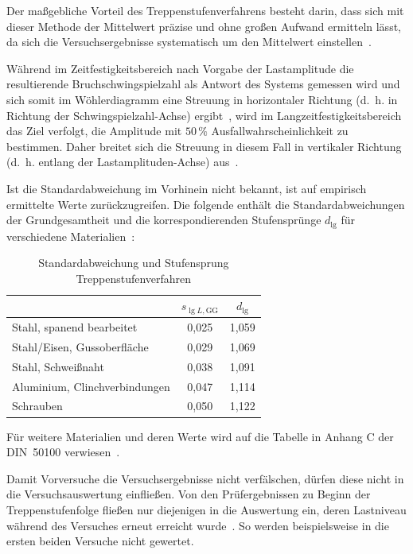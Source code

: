 Der maßgebliche Vorteil des Treppenstufenverfahrens besteht darin, dass sich mit dieser Methode der Mittelwert präzise und ohne großen Aufwand ermitteln lässt, da sich die Versuchsergebnisse systematisch um den Mittelwert einstellen~\cite[Seite~47]{DIN50100}. 

Während im Zeitfestigkeitsbereich nach Vorgabe der Lastamplitude die resultierende Bruchschwingspielzahl als Antwort des Systems gemessen wird und sich somit im Wöhlerdiagramm eine Streuung in horizontaler Richtung (d.~h. in Richtung der Schwingspielzahl-Achse) ergibt~\cite[Seite~54]{DIN50100}, wird im Langzeitfestigkeitsbereich das Ziel verfolgt, die Amplitude mit $50\,\%$ Ausfallwahrscheinlichkeit zu bestimmen. Daher breitet sich die Streuung in diesem Fall in vertikaler Richtung (d.~h. entlang der Lastamplituden-Achse) aus~\cite[Seite~44]{DIN50100}.

Ist die Standardabweichung im Vorhinein nicht bekannt, ist auf empirisch ermittelte Werte zurückzugreifen. Die folgende  enthält die Standardabweichungen der Grundgesamtheit und die korrespondierenden Stufensprünge $d_{\lg}$ für verschiedene Materialien~\cite[Seite~48]{DIN50100}:

\begin{table}[H]
\centering
\renewcommand{\arraystretch}{1.5} %
\caption{Standardabweichung und Stufensprung Treppenstufenverfahren \cite[Seite 48]{DIN50100}} 
\label{tab:Standardabweichung_Treppenstufenverfahren}
\begin{tabular}{|l|c|c|}
\hline
 & $s_{\lg L,\text{GG}}$ & $d_{\lg}$ \\ \hline
Stahl, spanend bearbeitet & 0,025 & 1,059 \\ \hline
Stahl/Eisen, Gussoberfläche & 0,029 & 1,069 \\ \hline
Stahl, Schweißnaht & 0,038 & 1,091 \\ \hline
Aluminium, Clinchverbindungen & 0,047 & 1,114 \\ \hline
Schrauben & 0,050 & 1,122 \\ \hline
\end{tabular}
\end{table}

Für weitere Materialien und deren Werte wird auf die Tabelle in Anhang C der DIN~50100 verwiesen~\cite[Seite~89]{DIN50100}. 

Damit Vorversuche die Versuchsergebnisse nicht verfälschen, dürfen diese nicht in die Versuchsauswertung einfließen. Von den Prüfergebnissen zu Beginn der Treppenstufenfolge fließen nur diejenigen in die Auswertung ein, deren Lastniveau während des Versuches erneut erreicht wurde~\cite[Seite~59]{DIN50100}. So werden beispielsweise in  die ersten beiden Versuche nicht gewertet. 

